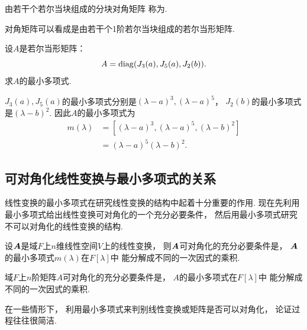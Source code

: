 \begin{definition}
由若干个若尔当块组成的分块对角矩阵
称为.
\end{definition}
\begin{remark}
对角矩阵可以看成是由若干个1阶若尔当块组成的若尔当形矩阵.
\end{remark}

\begin{example}
设\(A\)是若尔当形矩阵：\begin{equation*}
	A = \operatorname{diag}(J_3(a),J_5(a),J_2(b)).
\end{equation*}
求\(A\)的最小多项式.
\begin{solution}
\(J_3(a),J_5(a)\)的最小多项式分别是\((\lambda-a)^3,(\lambda-a)^5\)，
\(J_2(b)\)的最小多项式是\((\lambda-b)^2\).
因此\(A\)的最小多项式为\begin{align*}
	m(\lambda)
	&= [(\lambda-a)^3,(\lambda-a)^5,(\lambda-b)^2] \\
	&= (\lambda-a)^5(\lambda-b)^2.
\end{align*}
\end{solution}
\end{example}

\subsection{可对角化线性变换与最小多项式的关系}
线性变换的最小多项式在研究线性变换的结构中起着十分重要的作用.
现在先利用最小多项式给出线性变换可对角化的一个充分必要条件，
然后用最小多项式研究不可以对角化的线性变换的结构.

\begin{theorem}
设\(\boldsymbol{A}\)是域\(F\)上\(n\)维线性空间\(V\)上的线性变换，
则\(\boldsymbol{A}\)可对角化的充分必要条件是，
\(\boldsymbol{A}\)的最小多项式\(m(\lambda)\)在\(F[\lambda]\)中
能分解成不同的一次因式的乘积.
\end{theorem}

\begin{corollary}
域\(F\)上\(n\)阶矩阵\(A\)可对角化的充分必要条件是，
\(A\)的最小多项式在\(F[\lambda]\)中
能分解成不同的一次因式的乘积.
\end{corollary}
\begin{remark}
在一些情形下，
利用最小多项式来判别线性变换或矩阵是否可以对角化，
论证过程往往很简洁.
\end{remark}

